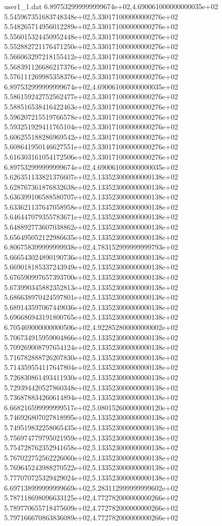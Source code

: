 \begin{filecontents}{user1_1.dat}
6.897532999999999674e+02,4.690061000000000035e+02
5.545967351683748348e+02,5.330171000000000276e+02
5.548265714956012289e+02,5.330171000000000276e+02
5.556015324450952448e+02,5.330171000000000276e+02
5.552882721176471250e+02,5.330171000000000276e+02
5.566063297218155412e+02,5.330171000000000276e+02
5.568391126686217376e+02,5.330171000000000276e+02
5.576111269985358376e+02,5.330171000000000276e+02
6.897532999999999674e+02,4.690061000000000035e+02
5.586159242752562477e+02,5.330171000000000276e+02
5.588516538416422463e+02,5.330171000000000276e+02
5.596207215519766578e+02,5.330171000000000276e+02
5.593251929411765104e+02,5.330171000000000276e+02
5.606255188286969542e+02,5.330171000000000276e+02
5.608641950146627551e+02,5.330171000000000276e+02
5.616303161054172506e+02,5.330171000000000276e+02
6.897532999999999674e+02,4.690061000000000035e+02
5.626351133821376607e+02,5.133523000000000138e+02
5.628767361876832638e+02,5.133523000000000138e+02
5.636399106588580707e+02,5.133523000000000138e+02
5.633621137647058958e+02,5.133523000000000138e+02
5.646447079355783671e+02,5.133523000000000138e+02
5.648892773607038862e+02,5.133523000000000138e+02
5.656495052122986635e+02,5.133523000000000138e+02
6.806758399999999938e+02,4.783152999999999793e+02
5.666543024890190736e+02,5.133523000000000138e+02
5.669018185337243949e+02,5.133523000000000138e+02
5.676590997657393700e+02,5.133523000000000138e+02
5.673990345882352813e+02,5.133523000000000138e+02
5.686638970424597801e+02,5.133523000000000138e+02
5.689143597067449036e+02,5.133523000000000138e+02
5.696686943191800765e+02,5.133523000000000138e+02
6.705469000000000506e+02,4.922852800000000002e+02
5.706734915959004866e+02,5.133523000000000138e+02
5.709269008797654124e+02,5.133523000000000138e+02
5.716782888726207830e+02,5.133523000000000138e+02
5.714359554117647804e+02,5.133523000000000138e+02
5.726830861493411930e+02,5.133523000000000138e+02
5.729394420527860348e+02,5.133523000000000138e+02
5.736878834260614894e+02,5.133523000000000138e+02
6.668216599999999517e+02,5.080152600000000120e+02
5.746926807027818995e+02,5.133523000000000138e+02
5.749519832258065435e+02,5.133523000000000138e+02
5.756974779795021959e+02,5.133523000000000138e+02
5.754728762352941658e+02,5.133523000000000138e+02
5.767022752562226060e+02,5.133523000000000138e+02
5.769645243988270522e+02,5.133523000000000138e+02
5.777070725329429024e+02,5.133523000000000138e+02
6.697138999999999669e+02,5.283112999999999602e+02
5.787118698096633125e+02,4.772782000000000266e+02
5.789770655718475609e+02,4.772782000000000266e+02
5.797166670863836089e+02,4.772782000000000266e+02

\end{filecontents}
